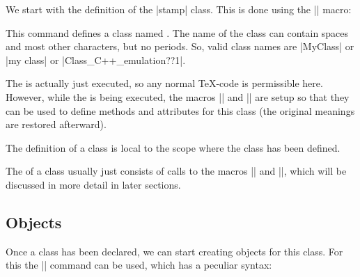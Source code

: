 We start with the definition of the |stamp| class. This is done using
the |\pgfooclass| macro:

\begin{command}{\pgfooclass{}}
  This command defines a class named . The name of
  the class can contain spaces and most other characters, but no
  periods. So, valid class names are |MyClass| or |my class| or
  |Class_C++_emulation??1|.

  The  is actually just executed, so any 
  normal \TeX-code is permissible here. However, while the  is
  being executed, the macros |\method| and |\attribute| are setup so
  that they can be used to define methods and attributes for this
  class (the original meanings are restored afterward). 

  The definition of a class is local to the scope where the class has
  been defined.
\begin{codeexample}

\end{codeexample}
\end{command}

The  of a class usually just consists of calls to the macros
|\attribute| and |\method|, which will be discussed in more detail in
later sections.



\subsection{Objects}

Once a class has been declared, we can start creating objects for this
class. For this the |\pgfoonew| command can be used, which has a
peculiar syntax:

